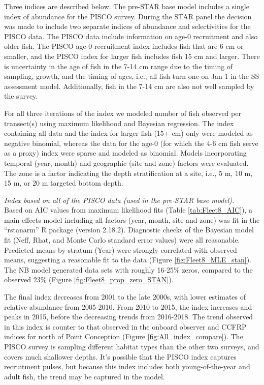 \documentclass[12pt,]{article}
\begin{document}
Three indices are described below. The pre-STAR base model includes a
single index of abundance for the PISCO survey. During the STAR panel
the decision was made to include two separate indices of abundance and
selectivities for the PISCO data. The PISCO data include information on
age-0 recruitment and also older fish. The PISCO age-0 recruitment index
includes fish that are 6 cm or smaller, and the PISCO index for larger
fish includes fish 15 cm and larger. There is uncertainty in the age of
fish in the 7-14 cm range due to the timing of sampling, growth, and the
timing of ages, i.e., all fish turn one on Jan 1 in the SS assessment
model. Additionally, fish in the 7-14 cm are also not well sampled by
the survey.

For all three iterations of the index we modeled number of fish observed
per transect(s) using maximum likelihood and Bayesian regression. The
index containing all data and the index for larger fish (15+ cm) only
were modeled as negative binomial, whereas the data for the age-0 (for
which the 4-6 cm fish serve as a proxy) index were sparse and modeled as
binomial. Models incorporating temporal (year, month) and geographic
(site and zone) factors were evaluated. The zone is a factor indicating
the depth stratification at a site, i.e., 5 m, 10 m, 15 m, or 20 m
targeted bottom depth.

\emph{Index based on all of the PISCO data (used in the pre-STAR base
model).}\\
Based on AIC values from maximum likelihood fits (Table
\ref{tab:Fleet8_AIC}), a main effects model including all factors (year,
month, site and zone) was fit in the ``rstanarm'' R package (version
2.18.2). Diagnostic checks of the Bayesian model fit (Neff, Rhat, and
Monte Carlo standard error values) were all reasonable. Predicted means
by stratum (Year) were strongly correlated with observed means,
suggesting a reasonable fit to the data (Figure
\ref{fig:Fleet8_MLE_stan}). The NB model generated data sets with
roughly 16-25\% zeros, compared to the observed 23\% (Figure
\ref{fig:Fleet8_prop_zero_STAN}).

The final index decreases from 2001 to the late 2000s, with lower
estimates of relative abundance from 2005-2010. From 2010 to 2015, the
index increases and peaks in 2015, before the decreasing trends from
2016-2018. The trend observed in this index is counter to that observed
in the onboard observer and CCFRP indices for north of Point Conception
(Figure \ref{fig:All_index_compare}). The PISCO survey is sampling
different habitat types than the other two surveys, and covers much
shallower depths. It's possible that the PISCO index captures
recruitment pulses, but because this index includes both
young-of-the-year and adult fish, the trend may be captured in the
model.
\end{document}

